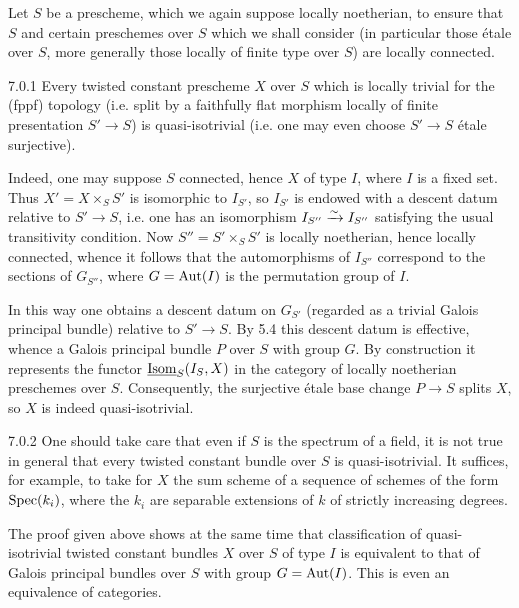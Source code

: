 Let $S$ be a prescheme, which we again suppose locally noetherian, to ensure that $S$ and certain preschemes over $S$ which we shall consider (in particular those étale over $S$, more generally those locally of finite type over $S$) are locally connected.
\begin{proposition}{7.0.1}\label{X.7.0.1}
Every twisted constant prescheme $X$ over $S$ which is locally trivial for the (fppf) topology (i.e. split by a faithfully flat morphism locally of finite presentation $S'\to S$) is quasi-isotrivial (i.e. one may even choose $S'\to S$ étale surjective).
\end{proposition}
Indeed, one may suppose $S$ connected, hence $X$ of type $I$, where $I$ is a fixed set. Thus $X'=X\times_S S'$ is isomorphic to $I_{S'}$, so $I_{S'}$ is endowed with a descent datum relative to $S'\to S$, i.e. one has an isomorphism $I_{S''}\xrightarrow{\sim} I_{S''}$ satisfying the usual transitivity condition. Now $S''=S'\times_S S'$ is locally noetherian, hence locally connected, whence it follows that the automorphisms of $I_{S''}$ correspond to the sections of $G_{S''}$, where $G=\operatorname{Aut}(I)$ is the permutation group of $I$.

In this way one obtains a descent datum on $G_{S'}$ (regarded as a trivial Galois principal bundle) relative to $S'\to S$. By 5.4 this descent datum is effective, whence a Galois principal bundle $P$ over $S$ with group $G$. By construction it represents the functor $\underline{\operatorname{Isom}}_S(I_S,X)$ in the category of locally noetherian preschemes over $S$. Consequently, the surjective étale base change $P\to S$ splits $X$, so $X$ is indeed quasi-isotrivial.
\begin{remark}{7.0.2}\label{X.7.0.2}
One should take care that even if $S$ is the spectrum of a field, it is not true in general that every twisted constant bundle over $S$ is quasi-isotrivial. It suffices, for example, to take for $X$ the sum scheme of a sequence of schemes of the form $\operatorname{Spec}(k_i)$, where the $k_i$ are separable extensions of $k$ of strictly increasing degrees.
\end{remark}
The proof given above shows at the same time that classification of quasi-isotrivial twisted constant bundles $X$ over $S$ of type $I$ is equivalent to that of Galois principal bundles over $S$ with group $G=\operatorname{Aut}(I)$. This is even an equivalence of categories.


